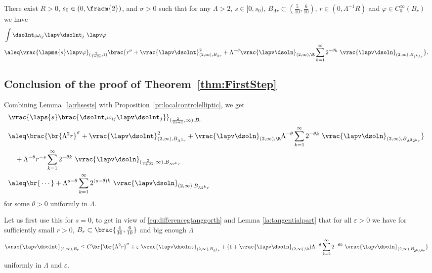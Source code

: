 \begin{lemma}\label{la:rhsests}
There exist $R > 0$, $s_0 \in (0,\fracm{2})$, and $\sigma>0$
such that for any $\Lambda > 2$, $s \in [0,s_0)$, 
$B_{\Lambda r} \subset (\frac{5}{10},\frac{6}{10})$, 
$r \in (0,\Lambda^{-1}R)$ and $\varphi \in C_0^\infty(B_r)$ we have
\begin{align*}
 &\int \dsolnt_i \omega_{ij} \lapv \dsolnt_j\ \lapv \varphi \\
 &\aleq \vrac{\lapms{s} \lapv \varphi}_{(\frac{2}{1-2s},1)} \brac{r^\sigma + \vrac{\lapv \dsolnt}_{(2,\infty),B_{\Lambda r}}^2+ \Lambda^{-\theta} \vrac{\lapv \dsoln}_{(2,\infty),\R}\sum_{k=1}^\infty 2^{-\theta k}\ \vrac{\lapv \dsoln}_{(2,\infty),B_{2^k\Lambda r}}}.  
\end{align*}
\end{lemma}


\subsection{Conclusion of the proof of Theorem~\ref{thm:FirstStep}}

Combining Lemma~\ref{la:rhsests} with Proposition~\ref{pr:localcontrolelliptic}, we get 
\begin{align}
 &\vrac{\laps{s}\brac{\dsolnt_i \omega_{ij} \lapv \dsolnt_j}}_{(\frac{2}{2s+1},\infty),B_{r}} \nonumber\\
&\aleq 
\brac{\br{\Lambda^{2}r}^\sigma + \vrac{\lapv \dsolnt}_{(2,\infty),B_{\Lambda^{3}r}}^2+ \vrac{\lapv \dsoln}_{(2,\infty),\R} \Lambda^{-\theta} \sum_{k=1}^\infty 2^{-\theta k}\ 
\vrac{\lapv \dsoln}_{(2,\infty),B_{\Lambda^{3} 2^k r}}} \nonumber
\\ &\quad {}+ \Lambda ^{-\theta}r^{-s} \sum_{k=1}^\infty 2^{-\theta k}\ \vrac{\lapv \dsoln}_{(\frac2{1+2s},\infty),B_{\Lambda 2^k r}}\nonumber\\
&\aleq\br{\rule{0ex}{4ex}\cdots} +
\Lambda^{s-\theta} \sum_{k=1}^\infty 2^{(s-\theta) k}\ \vrac{\lapv \dsoln}_{(2,\infty),B_{\Lambda 2^k r}}
\label{eq:nonorthogpartest1}
\end{align}
for some $\theta >0$ uniformly in $\Lambda$.

Let us first use this for $s = 0$, to get in view of \eqref{eq:differencegtanggorth} 
and Lemma \ref{la:tangentialpart} that for all $\varepsilon>0$ we have for sufficiently small
 $r>0$, $B_r \subset \brac{\frac{4}{10},\frac{6}{10}}$  and big enough $\Lambda$
\[
 \vrac{\lapv \dsolnt}_{(2,\infty),B_r} \leq C\br{\br{\Lambda^{2}r}^\sigma + 
  \varepsilon\ \vrac{\lapv \dsolnt}_{(2,\infty),B_{\Lambda^{3} r}}+ (1+\vrac{\lapv \dsoln}_{(2,\infty),\R}) \Lambda^{-\theta} \sum_{k=2}^\infty 2^{-\theta k}\ \vrac{\lapv \dsoln}_{(2,\infty),B_{2^k \Lambda^{3} r}}}
\]
uniformly in $\Lambda$ and $\varepsilon$.

